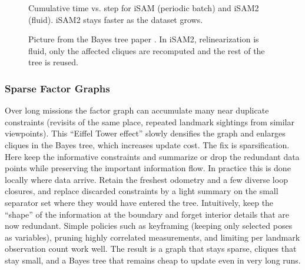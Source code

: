 \begin{figure}[H]
\begin{minipage}[t]{0.55\linewidth}
    \caption*{\small Cumulative time vs. step for iSAM (periodic batch) and iSAM2 (fluid). iSAM2 stays faster as the dataset grows.}
  \end{minipage}
  \caption{Picture from the Bayes tree paper \cite{Bayes_tree_for_SLAM_paper}. In iSAM2, relinearization is fluid, only the affected cliques are recomputed and the rest of the tree is reused.}
  \label{fig:optimizer-iSAM2-fluid-relin}
\end{figure}



\subsubsection{Sparse Factor Graphs}
Over long missions the factor graph can accumulate many near duplicate constraints (revisits of the same place, repeated landmark sightings from similar viewpoints). This “Eiffel Tower effect” slowly densifies the graph and enlarges cliques in the Bayes tree, which increases update cost. The fix is sparsification. Here keep the informative constraints and summarize or drop the redundant data points while preserving the important information flow. In practice this is done locally where data arrive. Retain the freshest odometry and a few diverse loop closures, and replace discarded constraints by a light summary on the small separator set where they would have entered the tree. Intuitively, keep the ``shape'' of the information at the boundary and forget interior details that are now redundant. Simple policies such as keyframing (keeping only selected poses as variables), pruning highly correlated measurements, and limiting per landmark observation count work well. The result is a graph that stays sparse, cliques that stay small, and a Bayes tree that remains cheap to update even in very long runs.



